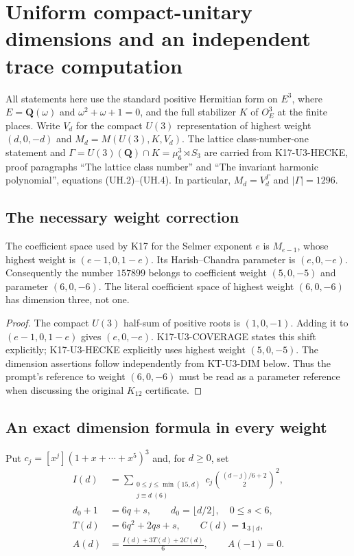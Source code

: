 \section{Uniform compact-unitary dimensions and an independent trace computation}
\label{sec:kt-unitary}

All statements here use the standard positive Hermitian form on
$E^3$, where $E=\mathbf Q(\omega)$ and $\omega^2+\omega+1=0$,
and the full stabilizer $K$ of $O_E^3$ at the finite places.
Write $V_d$ for the compact $U(3)$ representation of highest weight
$(d,0,-d)$ and $M_d=M(U(3),K,V_d)$.
The lattice class-number-one statement and
$\Gamma=U(3)(\mathbf Q)\cap K=\mu_6^3\rtimes S_3$ are carried
from K17-U3-HECKE, proof paragraphs ``The lattice class number'' and
``The invariant harmonic polynomial'', equations (UH.2)--(UH.4).
In particular, $M_d=V_d^\Gamma$ and $|\Gamma|=1296$.

\subsection{The necessary weight correction}
\begin{proposition}[KT-U3-WEIGHT]
The coefficient space used by K17 for the Selmer exponent $e$ is
$M_{e-1}$, whose highest weight is $(e-1,0,1-e)$.
Its Harish--Chandra parameter is $(e,0,-e)$.
Consequently the number $157899$ belongs to coefficient weight
$(5,0,-5)$ and parameter $(6,0,-6)$.
The literal coefficient space of highest weight $(6,0,-6)$ has
dimension three, not one.
\end{proposition}
\begin{proof}
The compact $U(3)$ half-sum of positive roots is $(1,0,-1)$.
Adding it to $(e-1,0,1-e)$ gives $(e,0,-e)$.
K17-U3-COVERAGE states this shift explicitly; K17-U3-HECKE
explicitly uses highest weight $(5,0,-5)$.
The dimension assertions follow independently from
KT-U3-DIM below. Thus the prompt's reference to weight $(6,0,-6)$
must be read as a parameter reference when discussing the original
$K_{12}$ certificate.
\end{proof}

\subsection{An exact dimension formula in every weight}

Put $c_j=[x^j](1+x+\cdots+x^5)^3$ and, for $d\geq0$, set
\begin{align*}
 I(d)&=\sum_{\substack{0\leq j\leq\min(15,d)\\j\equiv d\ (6)}}
      c_j\binom{(d-j)/6+2}{2}^{\!2},\\
 d_0+1&=6q+s,\qquad d_0=\lfloor d/2\rfloor,\quad0\leq s<6,\\
 T(d)&=6q^2+2qs+s,\qquad C(d)=\mathbf1_{3\mid d},\\
 A(d)&=\frac{I(d)+3T(d)+2C(d)}6,
 \qquad A(-1)=0.
\end{align*}

